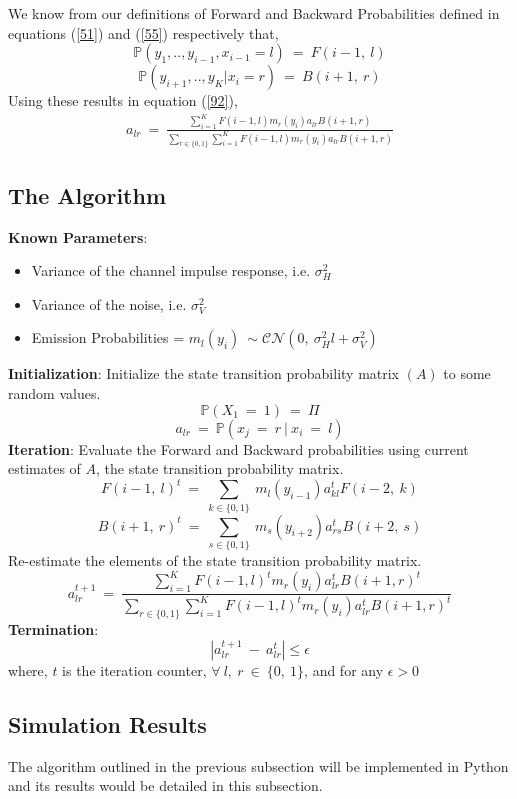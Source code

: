 \documentclass[12pt, draftcls, onecolumn]{IEEEtran}
\begin{document}
We know from our definitions of Forward and Backward Probabilities defined in equations (\ref{51}) and (\ref{55}) respectively that,
\[\mathbb{P}(y_1,..,y_{i-1},x_{i-1}=l)\ =\ F(i-1,\ l)\]
\[\mathbb{P}(y_{i+1},..,y_K|x_i=r)\ =\ B(i+1,\ r)\]
Using these results in equation (\ref{92}),
\begin{equation}\label{93}
    \begin{aligned}
        a_{lr}\ =\ \frac{\sum_{i=1}^{K}F(i-1,l)m_r(y_i)a_{lr}B(i+1,r)}{\sum_{r\in\{0,1\}}\sum_{i=1}^{K}F(i-1,l)m_r(y_i)a_{lr}B(i+1,r)}
    \end{aligned}
\end{equation}
\subsection{The Algorithm}
\textbf{Known Parameters}: 
\begin{itemize}
    \item Variance of the channel impulse response, i.e. $\sigma_H^2$
    \item Variance of the noise, i.e. $\sigma_V^2$
    \item Emission Probabilities = $m_l(y_i)\ \sim \mathcal{CN}(0,\ \sigma_H^2 l + \sigma_V^2)$
\end{itemize}
\textbf{Initialization}: Initialize the state transition probability matrix $(A)$ to some random values.
\[\mathbb{P}(X_1\ =\ 1)\ =\ \Pi\]
\[a_{lr}\ =\ \mathbb{P}(x_j\ =\ r\ |\ x_i\ =\ l)\]
\textbf{Iteration}: Evaluate the Forward and Backward probabilities using current estimates of $A$, the state transition probability matrix.
\[F(i-1,\ l)^{t}\ = \ \sum_{k\in\{0,1\}}\ m_l(y_{i-1})a_{kl}^tF(i-2,\ k)\]
\[B(i+1,\ r)^{t}\ =\ \sum_{s\in\{0,1\}}\ m_s(y_{i+2})a_{rs}^tB(i+2,\ s)\]
Re-estimate the elements of the state transition probability matrix.
\[a_{lr}^{t+1}\ =\ \frac{\sum_{i=1}^{K}F(i-1,l)^{t}m_r(y_i)a_{lr}^{t}B(i+1,r)^{t}}{\sum_{r\in\{0,1\}}\sum_{i=1}^{K}F(i-1,l)^{t}m_r(y_i)a_{lr}^{t}B(i+1,r)^{t}}\]
\textbf{Termination}: 
\[|a_{lr}^{t+1}\ -\ a_{lr}^t| \leq \epsilon\]
where,
$t$ is the iteration counter, $\forall\ l,\ r\ \in\ \{0,\ 1\}$, and for any $\epsilon > 0$
\subsection{Simulation Results}
The algorithm outlined in the previous subsection will be implemented in Python and its results would be detailed in this subsection.
\end{document}
